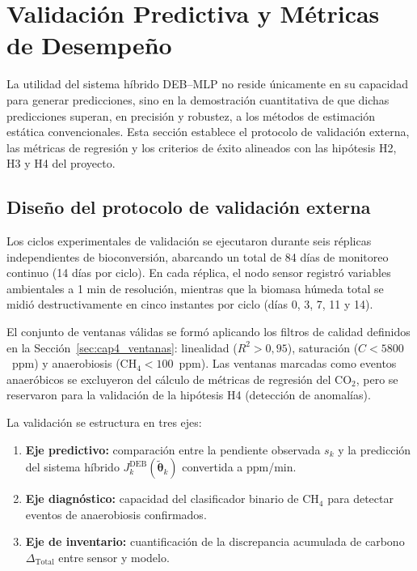 \section{Validación Predictiva y Métricas de Desempeño}
\label{sec:cap5_validacion}

La utilidad del sistema híbrido DEB--MLP no reside únicamente en su capacidad para generar predicciones, sino en la demostración cuantitativa de que dichas predicciones superan, en precisión y robustez, a los métodos de estimación estática convencionales. Esta sección establece el protocolo de validación externa, las métricas de regresión y los criterios de éxito alineados con las hipótesis H2, H3 y H4 del proyecto.

\subsection{Diseño del protocolo de validación externa}
\label{subsec:cap5_protocolo_validacion}

Los ciclos experimentales de validación se ejecutaron durante seis réplicas independientes de bioconversión, abarcando un total de 84 días de monitoreo continuo (14 días por ciclo). En cada réplica, el nodo sensor registró variables ambientales a 1 min de resolución, mientras que la biomasa húmeda total se midió destructivamente en cinco instantes por ciclo (días 0, 3, 7, 11 y 14).

El conjunto de ventanas válidas se formó aplicando los filtros de calidad definidos en la Sección~\ref{sec:cap4_ventanas}: linealidad ($R^2 > 0{,}95$), saturación ($C < 5800$~ppm) y anaerobiosis ($\mathrm{CH_4} < 100$~ppm). Las ventanas marcadas como eventos anaeróbicos se excluyeron del cálculo de métricas de regresión del CO$_2$, pero se reservaron para la validación de la hipótesis H4 (detección de anomalías).

La validación se estructura en tres ejes:

\begin{enumerate}
    \item \textbf{Eje predictivo:} comparación entre la pendiente observada $s_k$ y la predicción del sistema híbrido $J_k^{\mathrm{DEB}}(\tilde{\boldsymbol{\theta}}_k)$ convertida a ppm/min.
    \item \textbf{Eje diagnóstico:} capacidad del clasificador binario de CH$_4$ para detectar eventos de anaerobiosis confirmados.
    \item \textbf{Eje de inventario:} cuantificación de la discrepancia acumulada de carbono $\Delta_{\mathrm{Total}}$ entre sensor y modelo.
\end{enumerate}

